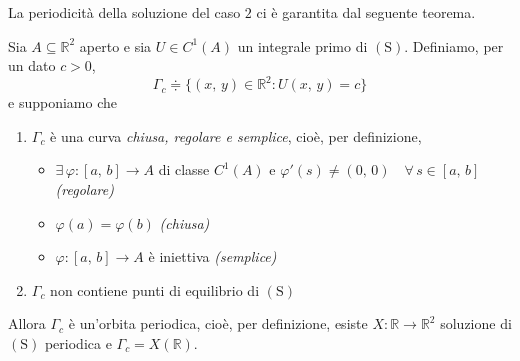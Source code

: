 La periodicità della soluzione del caso $2$ ci è garantita dal seguente teorema.

\begin{thm}
Sia $A \subseteq \mathbb{R}^2$ aperto e sia $U \in C^1(A)$ un integrale primo di $\mathrm{(S)}$. Definiamo, per un dato $c>0$, 
$$
\Gamma_c \doteqdot \lbrace (x,\,y) \in \mathbb{R}^2 : U(x,\,y) = c \rbrace
$$
e supponiamo che
\begin{enumerate}[labelindent=\parindent,leftmargin=*,label=\textnormal{(\roman*)},start=1]
\item $\Gamma_c$ è una curva \emph{chiusa, regolare e semplice}, cioè, per definizione,
	\begin{itemize}
	\item $\exists \, \varphi : [a,\,b] \longrightarrow A$ di classe $C^1(A)$ e $\varphi'(s) \neq (0,\,0) \quad \forall \, s \in [a,\,b]$ \emph{(regolare)}
	\item $\varphi(a) = \varphi(b)$ \emph{(chiusa)}
	\item $\varphi : [a,\,b] \longrightarrow A$ è iniettiva \emph{(semplice)}	
	\end{itemize}
\item $\Gamma_c$ non contiene punti di equilibrio di $\mathrm{(S)}$
\end{enumerate}
Allora $\Gamma_c$ è un'orbita periodica, cioè, per definizione, esiste $X: \mathbb{R} \longrightarrow \mathbb{R}^2$ soluzione di $\mathrm{(S)}$ periodica e $\Gamma_c = X(\mathbb{R})$.
\end{thm}



